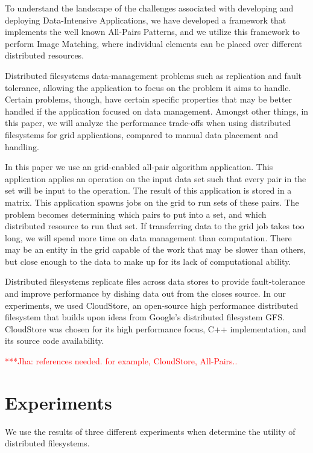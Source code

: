\documentclass[a4paper,11pt]{article} \usepackage[utf8]{inputenc}
\newcommand{\jhanote}[1]{ {\textcolor{red} { ***Jha: #1 }}}
\newcommand{\yyenote}[1]{ {\textcolor{blue} { ***yye00: #1 }}} \else
\newcommand{\jhanote}[1]{} \newcommand{\yyenote}[1]{}
\begin{document}
To understand the landscape of the challenges associated with developing
and deploying Data-Intensive Applications, we have developed a framework
that implements the well known All-Pairs Patterns, and we utilize this
framework to perform Image Matching, where individual elements can be
placed over different distributed resources.

Distributed filesystems %
data-management problems such as replication and fault tolerance,
allowing the application to focus on the problem it aims to handle.
Certain problems, though, have certain specific properties that may be
better handled if the application focused on data management.  Amongst
other things, in this paper, we will analyze the performance trade-offs
when using distributed filesystems for grid applications, compared to
manual data placement and handling.

In this paper we use an grid-enabled all-pair algorithm application.
This application applies an operation on the input data set such that
every pair in the set will be input to the operation.  The result of
this application is stored in a matrix.  This application spawns jobs on
the grid to run sets of these pairs.  The problem becomes determining
which pairs to put into a set, and which distributed resource to run
that set.  If transferring data to the grid job takes too long, we will
spend more time on data management than computation.  There may be an
entity in the grid capable of the work that may be slower than others,
but close enough to the data to make up for its lack of computational
ability.

Distributed filesystems replicate files across data stores to provide
fault-tolerance and improve performance by dishing data out from the
closes source.  In our experiments, we used CloudStore, an open-source
high performance distributed filesystem that builds upon ideas from
Google's distributed filesystem GFS.  CloudStore was chosen for its high
performance focus, C++ implementation, and its source code availability.

\jhanote{references needed. for example, CloudStore, All-Pairs.. }

\section{Experiments}

We use the results of three different experiments when determine the
utility of distributed filesystems.
\end{document}
